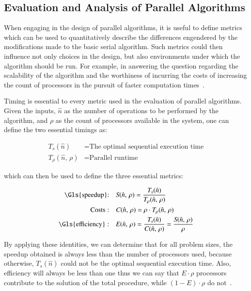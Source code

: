 %
%
%
%
\subsection{Evaluation and Analysis of Parallel Algorithms}
\label{ch2sPPssEAPA}
When engaging in the design of parallel algorithms, it is useful to define metrics which can be used to quantitatively describe the differences engendered by the modifications made to the basic serial algorithm. Such metrics could then influence not only choices in the design, but also environments under which the algorithm should be run. For example, in answering the question regarding the scalability of the algorithm and the worthiness of incurring the costs of increasing the count of processors in the pursuit of faster computation times~\cite[p.~330]{Lang17}.

Timing is essential to every metric used in the evaluation of parallel algorithms. Given the inputs, $\hat{n}$ as the number of operations to be performed by the algorithm, and $\rho$ as the count of processors available in the system, one can define the two essential timings as:

\begin{align}
	\mathit{T_s}(\hat{n}) &= \text{The optimal sequential execution time} \\
	\mathit{T_{\rho}}(\hat{n},\,\rho) &= \text{Parallel runtime}
	\label{eq:timings}
\end{align}

which can then be used to define the three essential metrics:

\begin{align}
	\text{\Gls{speedup}:}\quad&\mathit{S}(\hat{n},\,\rho) = \frac{\mathit{T_s}(\hat{n})}{\mathit{T_{\rho}}(\hat{n},\,\rho)} \\
	\text{Costs}:\quad&\mathit{C}(\hat{n},\,\rho) =\rho\cdot\mathit{T_{\rho}}(\hat{n},\,\rho) \\
	\text{\Gls{efficiency}}:\quad&\mathit{E}(\hat{n},\,\rho) = \frac{\mathit{T_s}(\hat{n})}{\mathit{C}(\hat{n},\,\rho)} = \frac{\mathit{S}(\hat{n},\,\rho)}{\rho}
	\label{eq:essentialMetrics}
\end{align}

By applying these identities, we can determine that for all problem sizes, the \gls{speedup} obtained is always less than the number of processors used, because otherwise, $\mathit{T_s}(\hat{n})$ could not be the optimal sequential execution time. Also, \gls{efficiency} will always be less than one thus we can say that $\mathit{E}\cdot\rho$ processors contribute to the solution of the total procedure, while $(1-\mathit{E})\cdot\rho$ do not~\cite[p.~335]{Lang17}.

